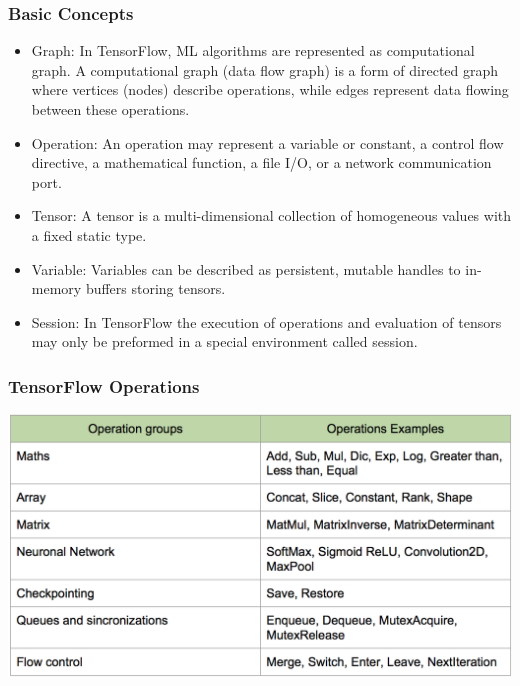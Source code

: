 \begin{frame}
  \MyLogo
  \frametitle{Basic Concepts}

\begin{itemize}

\item[\raisebox{-0.4ex}{\alert{\HandRight}}] Graph: In TensorFlow, ML algorithms are represented as computational graph. A computational graph (data flow graph) is a form of directed graph where vertices (nodes) describe operations, while edges represent data flowing between these operations.
	  	
\item Operation: An operation may represent a variable or constant, a control flow directive, a mathematical function, a file I/O, or a network communication port.
	  	
\item Tensor: A tensor is a multi-dimensional collection of homogeneous values with a fixed static type.
	  	
\item Variable: Variables can be described as persistent, mutable handles to in-memory buffers storing tensors.
	  	
\item[\raisebox{-0.4ex}{\alert{\HandRight}}] Session: In TensorFlow the execution of operations and evaluation of tensors may only be preformed in a special environment called session.
	  	
\end{itemize}

\end{frame}

%

\begin{frame}
	\MyLogo
	\frametitle{TensorFlow Operations}  

\centering\includegraphics[width=0.95\paperwidth]{figures/TFkernels.png} 
	
\end{frame}

